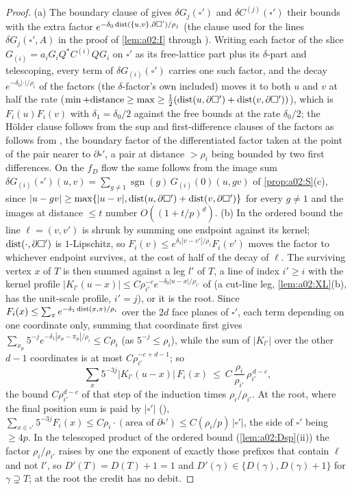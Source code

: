 \begin{proof}
(a) The boundary clause of \cite[Thm.~3.3]{K1} gives $\delta G_j(\square')$ and $\delta C^{(j)}(\square')$ their bounds with the extra factor $e^{-\delta_0\operatorname{dist}(\{u,v\},\partial\square')/\rho_j}$ (the clause used for the lines $\delta G_j(\square',A)$ in the proof of \cref{lem:a02:I} through \cite[(5.3)]{K2}). Writing each factor of the slice $G_{(i)}=a_iG_iQ^*C^{(i)}QG_i$ on $\square'$ as its free-lattice part plus its $\delta$-part and telescoping, every term of $\delta G_{(i)}(\square')$ carries one such factor, and the decay $e^{-\delta_0|\cdot|/\rho_i}$ of the factors (the $\delta$-factor's own included) moves it to both $u$ and $v$ at half the rate ($\min+\text{distance}\ge\max\ge\frac12(\operatorname{dist}(u,\partial\square')+\operatorname{dist}(v,\partial\square'))$), which is $F_i(u)F_i(v)$ with $\delta_1=\delta_0/2$ against the free bounds at the rate $\delta_0/2$; the H\"older clause follows from the sup and first-difference clauses of the factors as \cite[Prop.~3.7]{K1} follows from \cite[Thm.~3.3]{K1}, the boundary factor of the differentiated factor taken at the point of the pair nearer to $\partial\square'$, a pair at distance $>\rho_i$ being bounded by two first differences. On the $f_D$ flow the same follows from the image sum $\delta G_{(i)}(\square')(u,v)=\sum_{g\ne1}\operatorname{sgn}(g)\,G_{(i)}(0)(u,gv)$ of \cref{prop:a02:S}(c), since $|u-gv|\ge\max\{|u-v|,\operatorname{dist}(u,\partial\square')+\operatorname{dist}(v,\partial\square')\}$ for every $g\ne1$ and the images at distance $\le t$ number $O((1+t/p)^d)$. (b) In the ordered bound the line $\ell=(v,v')$ is shrunk by summing one endpoint against its kernel; $\operatorname{dist}(\cdot,\partial\square')$ is $1$-Lipschitz, so $F_i(v)\le e^{\delta_1|v-v'|/\rho_i}F_i(v')$ moves the factor to whichever endpoint survives, at the cost of half of the decay of $\ell$. The surviving vertex $x$ of $T$ is then summed against a leg $l'$ of $T$, a line of index $i'\ge i$ with the kernel profile $|K_{l'}(u-x)|\le C\rho_{i'}^{-c}e^{-\delta_0|u-x|/\rho_{i'}}$ of \cite[(3.63)--(3.65)]{K1} (a cut-line leg, \cref{lem:a02:XL}(b), has the unit-scale profile, $i'=j$), or it is the root. Since $F_i(x)\le\sum_\pi e^{-\delta_1\operatorname{dist}(x,\pi)/\rho_i}$ over the $2d$ face planes of $\square'$, each term depending on one coordinate only, summing that coordinate first gives $\sum_{x_\mu}5^{-j}e^{-\delta_1|x_\mu-\pi_\mu|/\rho_i}\le C\rho_i$ (as $5^{-j}\le\rho_i$), while the sum of $|K_{l'}|$ over the other $d-1$ coordinates is at most $C\rho_{i'}^{-c+d-1}$; so
\[
\sum_{x}5^{-3j}|K_{l'}(u-x)|\,F_i(x)\ \le\ C\,\frac{\rho_i}{\rho_{i'}}\,\rho_{i'}^{\,d-c},
\]
the bound $C\rho_{i'}^{d-c}$ of that step of the induction times $\rho_i/\rho_{i'}$. At the root, where the final position sum is paid by $|\square'|$ (\cite[p.~664]{K1}), $\sum_{x\in\square'}5^{-3j}F_i(x)\le C\rho_i\cdot(\text{area of }\partial\square')\le C(\rho_i/p)\,|\square'|$, the side of $\square'$ being $\ge4p$. In the telescoped product of the ordered bound (\cref{lem:a02:Dsp}(ii)) the factor $\rho_i/\rho_{i'}$ raises by one the exponent of exactly those prefixes that contain $\ell$ and not $l'$, so $D'(T)=D(T)+1=1$ and $D'(\gamma)\in\{D(\gamma),D(\gamma)+1\}$ for $\gamma\supsetneq T$; at the root the credit has no debit.
\end{proof}

